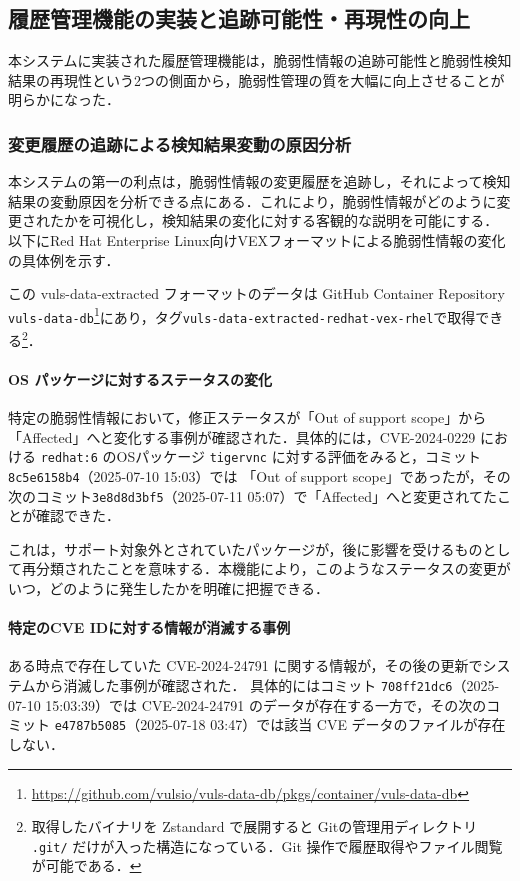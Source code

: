 \subsection{履歴管理機能の実装と追跡可能性・再現性の向上}

本システムに実装された履歴管理機能は，脆弱性情報の追跡可能性と脆弱性検知結果の再現性という2つの側面から，脆弱性管理の質を大幅に向上させることが明らかになった．

\subsubsection{変更履歴の追跡による検知結果変動の原因分析}

本システムの第一の利点は，脆弱性情報の変更履歴を追跡し，それによって検知結果の変動原因を分析できる点にある．これにより，脆弱性情報がどのように変更されたかを可視化し，検知結果の変化に対する客観的な説明を可能にする．以下にRed Hat Enterprise Linux向けVEXフォーマットによる脆弱性情報の変化の具体例を示す．

この vuls-data-extracted フォーマットのデータは GitHub Container Repository \texttt{vuls-data-db}\footnote{\url{https://github.com/vulsio/vuls-data-db/pkgs/container/vuls-data-db}}にあり，タグ\texttt{vuls-data-extracted-redhat-vex-rhel}で取得できる\footnote{取得したバイナリを Zstandard で展開すると Gitの管理用ディレクトリ \texttt{.git/} だけが入った構造になっている．Git 操作で履歴取得やファイル閲覧が可能である．}．

\paragraph{OS パッケージに対するステータスの変化}
特定の脆弱性情報において，修正ステータスが「Out of support scope」から「Affected」へと変化する事例が確認された．具体的には，CVE-2024-0229 における \texttt{redhat:6} のOSパッケージ \texttt{tigervnc} に対する評価をみると，コミット \texttt{8c5e6158b4}（2025-07-10 15:03）では 「Out of support scope」であったが，その次のコミット\texttt{3e8d8d3bf5}（2025-07-11 05:07）で「Affected」へと変更されてたことが確認できた．

これは，サポート対象外とされていたパッケージが，後に影響を受けるものとして再分類されたことを意味する．本機能により，このようなステータスの変更がいつ，どのように発生したかを明確に把握できる．

\paragraph{特定のCVE IDに対する情報が消滅する事例}
ある時点で存在していた CVE-2024-24791 に関する情報が，その後の更新でシステムから消滅した事例が確認された．
具体的にはコミット \texttt{708ff21dc6}（2025-07-10 15:03:39）では CVE-2024-24791 のデータが存在する一方で，その次のコミット \texttt{e4787b5085}（2025-07-18 03:47）では該当 CVE データのファイルが存在しない．

